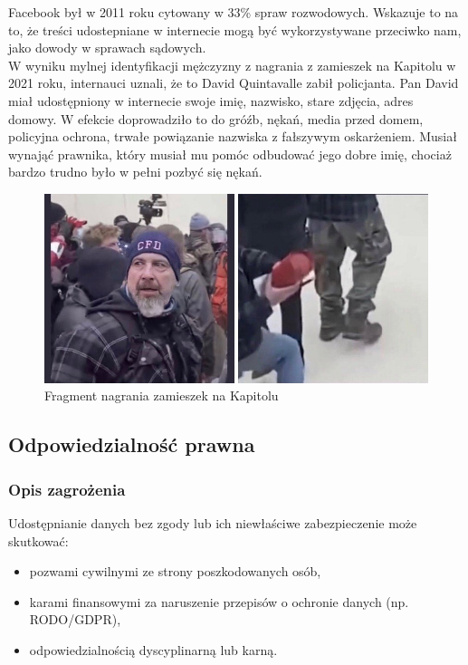 Facebook był w 2011 roku cytowany w 33\% spraw rozwodowych. Wskazuje to na to, że treści udostepniane w internecie mogą być wykorzystywane przeciwko nam, jako dowody w sprawach sądowych.\\

W wyniku mylnej identyfikacji mężczyzny z nagrania z zamieszek na Kapitolu w 2021 roku, internauci uznali, że to David Quintavalle zabił policjanta. Pan David miał udostępniony w internecie swoje imię, nazwisko, stare zdjęcia, adres domowy. W efekcie doprowadziło to do gróźb, nękań, media przed domem, policyjna ochrona, trwałe powiązanie nazwiska z fałszywym oskarżeniem. Musiał wynająć prawnika, który musiał mu pomóc odbudować jego dobre imię, chociaż bardzo trudno było w pełni pozbyć się nękań.

\begin{figure}[H]
  \centering
  \includegraphics[width=1\textwidth]{images/david.jpg}
  \caption{Fragment nagrania zamieszek na Kapitolu}
  \label{fig:david}
\end{figure} 

\subsection{Odpowiedzialność prawna}
\subsubsection{Opis zagrożenia}
Udostępnianie danych bez zgody lub ich niewłaściwe zabezpieczenie może skutkować:
\begin{itemize}
\item pozwami cywilnymi ze strony poszkodowanych osób,
\item karami finansowymi za naruszenie przepisów o ochronie danych (np. RODO/GDPR),
\item odpowiedzialnością dyscyplinarną lub karną.
\end{itemize}

